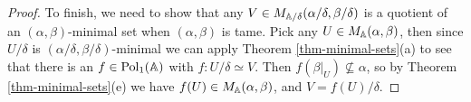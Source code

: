 \begin{appendices}
\begin{proof}
To finish, we need to show that any $V \in M_{\mathbb{A}/\delta}(\alpha/\delta,\beta/\delta)$ is a quotient of an $(\alpha,\beta)$-minimal set when $(\alpha,\beta)$ is tame. Pick any $U \in M_{\mathbb{A}}(\alpha,\beta)$, then since $U/\delta$ is $(\alpha/\delta,\beta/\delta)$-minimal we can apply Theorem \ref{thm-minimal-sets}(a) to see that there is an $f \in \operatorname{Pol}_1(\mathbb{A})$ with $f : U/\delta \simeq V$. Then $f(\beta|_U) \not\subseteq \alpha$, so by Theorem \ref{thm-minimal-sets}(e) we have $f(U) \in M_{\mathbb{A}}(\alpha,\beta)$, and $V = f(U)/\delta$.
\end{proof}

\begin{comment}
\begin{prop} If $(\alpha,\beta)$ is a tame congruence quotient on a finite algebra $\bA$, and if $C$ is a congruence class of $\beta$ which is not also a congruence class of $\alpha$, then $\bA|_C/\alpha|_C$ is a tame algebra.
\end{prop}
\begin{proof} By Corollary \ref{cor-trace-closure}, there is some $(\alpha,\beta)$-trace $N$ of some $(\alpha,\beta)$-minimal set $U$ such that $N \subseteq C$. By Theorem \ref{thm-minimal-sets}(b), there is some idempotent $e \in E(\bA)$ such that $e(\bA) = U$. Since $e$ preserves $\beta$ and $e(N) = N \subseteq C$, we must have $e(C) \subseteq C$, so $e \in E(\bA|_C)$. We will prove that $N = U \cap C$ is an $(\alpha|_C,1_C)$-minimal set of $\bA|_C$, and that the restriction homomorphism $\llbracket \alpha|_C, 1_C \rrbracket \twoheadrightarrow \llbracket \alpha|_N, 1_N \rrbracket$ is $0,1$-separating - this will allow us to apply the previous proposition.

If $f(C) \subseteq N$ for some $f \in \Pol_1(\bA|_C)$ such that $f(C)$ is not contained in any congruence class of $\alpha$, then by Corollary \ref{cor-trace-iso} we have $f : N \simeq f(N)$, so in fact $f(N) = N$. This proves that $N$ is an $(\alpha|_C,1_C)$-minimal set of $\bA|_C$.

Now suppose that $(x,y) \in C^2 \setminus \alpha|_C$. Then by Theorem \ref{thm-minimal-sets}
\end{proof}
\end{comment}


\end{appendices}
